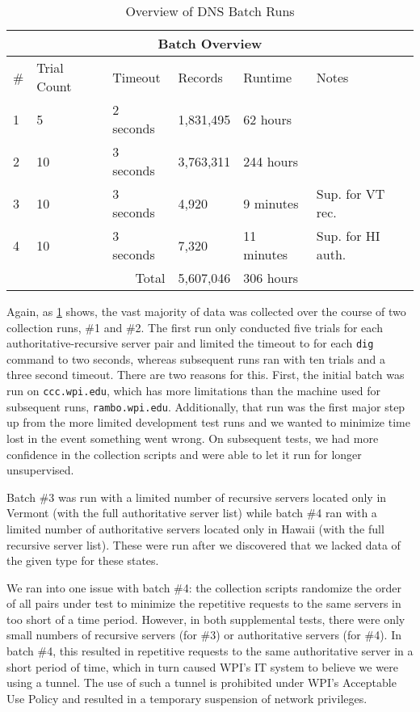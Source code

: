 \begin{table}[h]
    \centering
    \begin{tabular}{ |p{1cm}||p{2cm}|p{2cm}|p{2cm}|p{2cm}|p{4cm}|  }
     \hline
     \multicolumn{6}{|c|}{Batch Overview} \\
     \hline
     \# & Trial Count & Timeout & Records & Runtime & Notes \\
     \hline
     1 & 5 & 2 seconds & 1,831,495 & 62 hours & \\
     2 & 10 & 3 seconds & 3,763,311 & 244 hours & \\
     3 & 10 & 3 seconds & 4,920 & 9 minutes  & Sup. for VT rec. \\
     4 & 10 & 3 seconds & 7,320 & 11 minutes & Sup. for HI auth. \\
     \hline
     \multicolumn{3}{|r|}{Total} & 5,607,046 & 306 hours & \\
     \hline
    \end{tabular}
    \caption{Overview of DNS Batch Runs}
    \label{tab:dns_batch_overview}
\end{table}

Again, as \cref{tab:dns_batch_overview} shows, the vast majority of data was collected over the course of two collection runs, \#1 and \#2. The first run only conducted five trials for each authoritative-recursive server pair and limited the timeout to for each \texttt{dig} command to two seconds, whereas subsequent runs ran with ten trials and a three second timeout. There are two reasons for this. First, the initial batch was run on \texttt{ccc.wpi.edu}, which has more limitations than the machine used for subsequent runs, \texttt{rambo.wpi.edu}. Additionally, that run was the first major step up from the more limited development test runs and we wanted to minimize time lost in the event something went wrong. On subsequent tests, we had more confidence in the collection scripts and were able to let it run for longer unsupervised.

Batch \#3 was run with a limited number of recursive servers located only in Vermont (with the full authoritative server list) while batch \#4 ran with a limited number of authoritative servers located only in Hawaii (with the full recursive server list). These were run after we discovered that we lacked data of the given type for these states. 

We ran into one issue with batch \#4: the collection scripts randomize the order of all pairs under test to minimize the repetitive requests to the same \dns servers in too short of a time period. However, in both supplemental tests, there were only small numbers of recursive servers (for \#3) or authoritative servers (for \#4). In batch \#4, this resulted in repetitive requests to the same authoritative server in a short period of time, which in turn caused WPI's IT system to believe we were using a \dns tunnel. The use of such a tunnel is prohibited under WPI's Acceptable Use Policy and resulted in a temporary suspension of network privileges.

